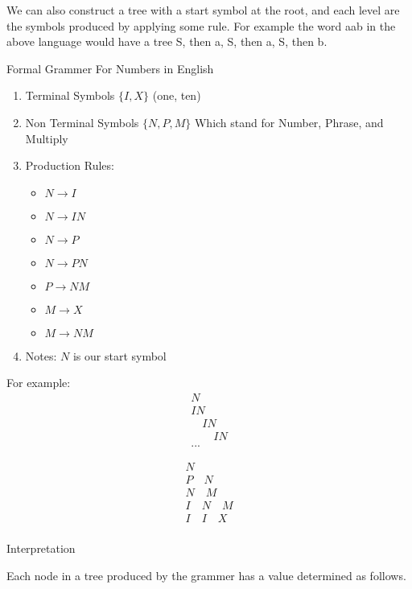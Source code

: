 \documentclass{report}
\begin{document}
\begin{description}
\begin{mdframed}
            We can also construct a tree with a start symbol
            at the root, and each level are the symbols
            produced by applying some rule. For example
            the word aab in the above language would
            have a tree S, then a, S, then a, S, then b.
        \end{mdframed}
    \item Formal Grammer For Numbers in English
        \begin{mdframed}
            \begin{enumerate}
                \item Terminal Symbols $\{I, X\}$ (one, ten)
                \item Non Terminal Symbols $\{N, P, M\}$ 
                    Which stand for Number, Phrase, and Multiply
                \item Production Rules:
                    \begin{itemize}
                        \item $N \to I$
                        \item $N \to I N$
                        \item $N \to P$
                        \item $N \to P N$
                        \item $P \to N M$
                        \item $M \to X$
                        \item $M \to N M$
                    \end{itemize}
                \item Notes: $N$ is our start symbol
            \end{enumerate}

            For example:
            \begin{gather}
               N\\ 
               I N\\
               \quad I N\\
               \quad \quad I N\\
               ...
            \end{gather}

            \begin{gather}
               N\\ 
               P \quad N\\
               N \quad M\\
               I \quad N \quad M\\
               I \quad I \quad X\\
            \end{gather}
        \end{mdframed}
        \pagebreak
    \item Interpretation
        \begin{mdframed}
            Each node in a tree produced by the grammer
            has a value determined as follows.


\end{mdframed}
\end{description}
\end{document}
